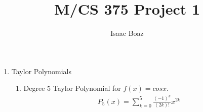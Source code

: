 \documentclass{article}
\title{\vspace{-5ex}M/CS 375 Project 1}
\author{Isaac Boaz}
\begin{document}
\maketitle

\begin{enumerate}
    \item Taylor Polynomials
          \begin{enumerate}[label=\alph*)]
                \item Degree 5 Taylor Polynomial for \(f(x) = cos x\).
                      \begin{align*}
                          P_5(x) = \sum_{k=0}^5 \frac{(-1)^k}{(2k)!} x^{2k}
                      \end{align*}
          \end{enumerate}
\end{enumerate}
\end{document}
